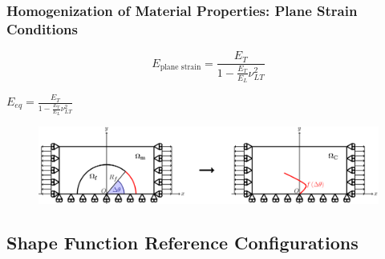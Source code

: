 \documentclass[first,firstsupp,lastsupp,last,hyperref,table]{ETHclass}
\begin{document}
\begin{frame}
\frametitle{\small Homogenization of Material Properties: Plane Strain Conditions}
\vspace{-0.5cm}
\centering
\small
\begin{equation*}
E_{\text{plane strain}}=\frac{E_{T}}{1-\frac{E_{T}}{E_{L}}\nu_{LT}^{2}}
\end{equation*}
\begin{alertblock}{\centering$E_{eq}=\frac{E_{T}}{1-\frac{E_{T}}{E_{L}}\nu_{LT}^{2}}$}
\end{alertblock}
\begin{figure}
\includegraphics[width=\textwidth]{RUCequivalence.pdf}
\end{figure}
\end{frame}

\subsection{Shape Function Reference Configurations}
\end{document}
